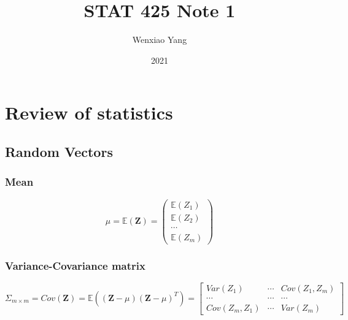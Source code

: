 \documentclass[11pt,a4paper]{article}
\title{STAT 425 Note 1}
\author[*]{Wenxiao Yang}
\affil[*]{Department of Mathematics, University of Illinois at Urbana-Champaign}
\date{2021}
\begin{document}
\maketitle
\tableofcontents
\newpage


\section{Review of statistics}
\subsection{Random Vectors}
\subsubsection{Mean}
$$\mu =\mathbb{E}(\mathbf{Z})=\begin{pmatrix}
    \mathbb{E}(Z_1)\\
    \mathbb{E}(Z_2)\\
    \cdots\\
    \mathbb{E}(Z_m)
\end{pmatrix}$$
\subsubsection{Variance-Covariance matrix}
$$\Sigma_{m\times m}=Cov(\mathbf{Z})=\mathbb{E}((\mathbf{Z}-\mu)(\mathbf{Z}-\mu)^T)=\begin{bmatrix}
    Var(Z_1)&\cdots	&Cov(Z_1,Z_m)\\
    \cdots&\cdots	&\cdots\\
    Cov(Z_m,Z_1)&\cdots &Var(Z_m)
\end{bmatrix}$$
\end{document}
